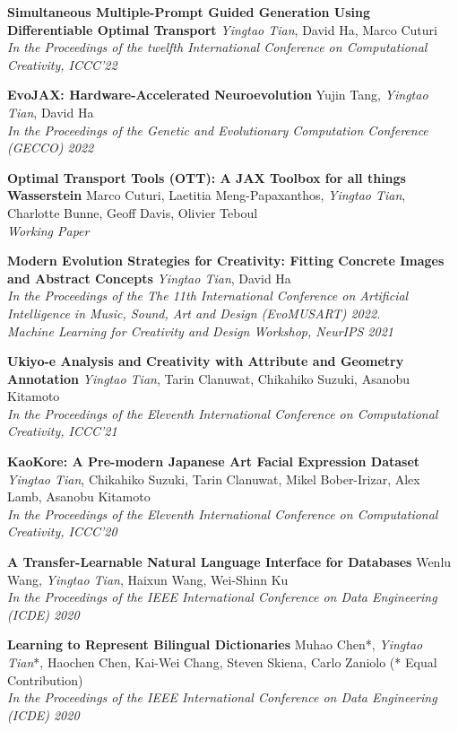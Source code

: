 \documentclass[line,margin]{cv}
\begin{document}
\begin{resume}
  {\bf Simultaneous Multiple-Prompt Guided Generation Using Differentiable Optimal Transport}
  \emph{Yingtao Tian}, David Ha, Marco Cuturi\\
  \emph{In the Proceedings of the twelfth International Conference on Computational Creativity, ICCC'22}

  {\bf EvoJAX: Hardware-Accelerated Neuroevolution}
  Yujin Tang, \emph{Yingtao Tian}, David Ha\\
  \emph{In the Proceedings of the Genetic and Evolutionary Computation Conference (GECCO) 2022}

  {\bf Optimal Transport Tools (OTT): A JAX Toolbox for all things Wasserstein}
  Marco Cuturi, Laetitia Meng-Papaxanthos, \emph{Yingtao Tian}, Charlotte Bunne, Geoff Davis, Olivier Teboul\\
  \emph{Working Paper}

  {\bf Modern Evolution Strategies for Creativity: Fitting Concrete Images and Abstract Concepts}
  \emph{Yingtao Tian}, David Ha\\
  \emph{In the Proceedings of the The 11th International Conference on Artificial Intelligence in Music, Sound, Art and Design (EvoMUSART) 2022.\\
  Machine Learning for Creativity and Design Workshop, NeurIPS 2021}

	{\bf  Ukiyo-e Analysis and Creativity with Attribute and Geometry Annotation}
	\emph{Yingtao Tian}, Tarin Clanuwat, Chikahiko Suzuki, Asanobu Kitamoto\\
	\emph{In the Proceedings of the Eleventh International Conference on Computational Creativity, ICCC'21}

	{\bf  KaoKore: A Pre-modern Japanese Art Facial Expression Dataset}
	\emph{Yingtao Tian}, Chikahiko Suzuki, Tarin Clanuwat, Mikel Bober-Irizar, Alex Lamb, Asanobu Kitamoto\\
	\emph{In the Proceedings of the Eleventh International Conference on Computational Creativity, ICCC'20}

	{\bf  A Transfer-Learnable Natural Language Interface for Databases}
	Wenlu Wang, \emph{Yingtao Tian}, Haixun Wang, Wei-Shinn Ku\\
	\emph{In the Proceedings of the IEEE International Conference on Data Engineering (ICDE) 2020}
	
	{\bf  Learning to Represent Bilingual Dictionaries}
	Muhao Chen*, \emph{Yingtao Tian}*, Haochen Chen, Kai-Wei Chang, Steven Skiena, Carlo Zaniolo  (* Equal Contribution)\\
	\emph{In the Proceedings of the IEEE International Conference on Data Engineering (ICDE) 2020}
	

\end{resume}
\end{document}
